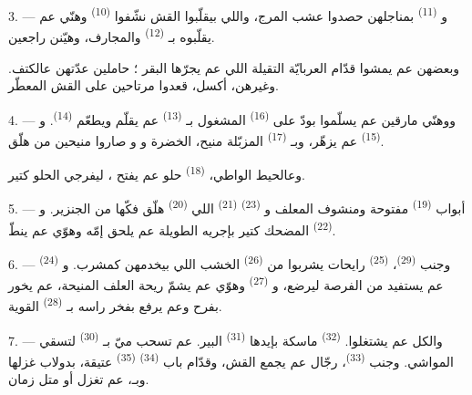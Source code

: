 3. --- و \textsuperscript{(11)} بمناجلهن حصدوا عشب
المرج، واللي بيقلّبوا القش نشّفوا  \textsuperscript{(10)} وهنّي
عم يقلّبوه بـ \textsuperscript{(12)} والمجارف، وهيّنن
راجعين.

وبعضهن عم يمشوا قدّام العربايّة التقيلة اللي عم يجرّها البقر ؛ حاملين
عدّتهن عالكتف. وغيرهن، أكسل، قعدوا مرتاحين على القش المعطّر.

4. --- ووهنّي مارقين عم يسلّموا بودّ على 
\textsuperscript{(16)} المشغول بـ \textsuperscript{(13)} عم
يقلّم  ويطعّم 
\textsuperscript{(14)}. و \textsuperscript{(15)} عم يزهّر،
وبـ \textsuperscript{(17)} المزبّلة منيح، الخضرة
و و صاروا منيحين من هلّق.

وعالحيط الواطي،  \textsuperscript{(18)} حلو عم يفتح
، ليفرجي  الحلو كتير.

\VUsaut{3.0mm}

5. --- أبواب  \textsuperscript{(19)} مفتوحة ومنشوف المعلف
و \textsuperscript{(23)}  \textsuperscript{(21)} اللي
 \textsuperscript{(20)} هلّق فكّها من الجنزير.
و \textsuperscript{(22)} المضحك كتير بإجريه الطويلة عم يلحق
إمّه وهوّي عم ينطّ.

6. --- وجنب  \textsuperscript{(29)}، 
\textsuperscript{(25)} رايحات يشربوا من  \textsuperscript{(26)}
الخشب اللي بيخدمهن كمشرب. و \textsuperscript{(24)} عم يستفيد
من الفرصة ليرضع، و \textsuperscript{(27)} وهوّي عم يشمّ
ريحة العلف المنيحة، عم يخور بفرح وعم يرفع بفخر راسه
بـ \textsuperscript{(28)} القوية.

7. --- والكل عم يشتغلوا.  \textsuperscript{(32)} ماسكة
بإيدها  \textsuperscript{(31)} البير. عم تسحب ميّ
بـ \textsuperscript{(30)} لتسقي المواشي. وجنب 
\textsuperscript{(33)}، رجّال عم يجمع القش، وقدّام باب 
\textsuperscript{(34)}  \textsuperscript{(35)} عتيقة، بدولاب
غزلها وبـ، عم تغزل  أو 
متل زمان.

\VUsaut{3.0mm}
\VUsaut{3.0mm}

